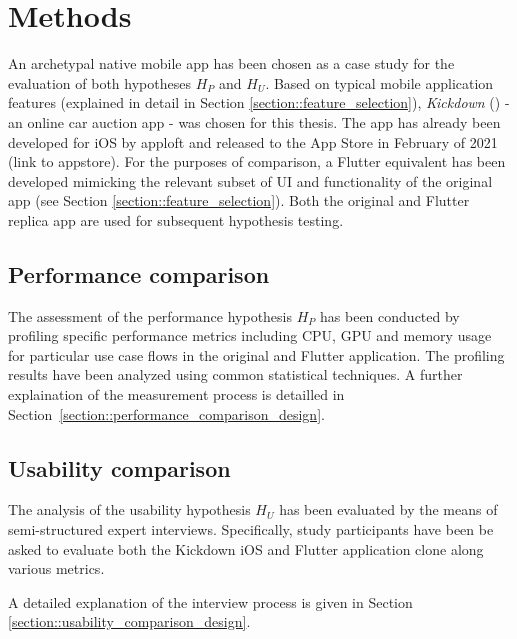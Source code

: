 \section{Methods} \label{section::methods}
An archetypal native mobile app has been chosen as a case study for the evaluation of both hypotheses $H_P$ and $H_U$.
Based on typical mobile application features (explained in detail in Section \ref{section::feature_selection}), \textit{Kickdown} (\cite{Kickdown2021}) - an online car auction app - was chosen for this thesis. 
The app has already been developed for iOS by apploft and released to the App Store in February of 2021 (link to appstore).
For the purposes of comparison, a Flutter equivalent has been developed mimicking the relevant subset of UI and functionality of the original app (see Section \ref{section::feature_selection}). 
Both the original and Flutter replica app are used for subsequent hypothesis testing.


\subsection{Performance comparison}
The assessment of the performance hypothesis $H_P$ has been conducted by profiling specific performance metrics including CPU, GPU and memory usage 
for particular use case flows in the original and Flutter application. 
The profiling results have been analyzed using common statistical techniques.
A further explaination of the measurement process is detailled in Section~\ref{section::performance_comparison_design}.

\subsection{Usability comparison}
The analysis of the usability hypothesis $H_U$ has been evaluated by the means of semi-structured expert interviews.
Specifically, study participants have been be asked to evaluate both the Kickdown iOS and Flutter application clone along various metrics.

A detailed explanation of the interview process is given in Section \ref{section::usability_comparison_design}.

